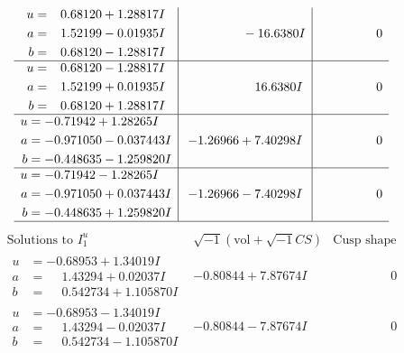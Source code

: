 \documentclass[1p]{elsarticle_modified}
\theoremstyle{definition}
\newcommand{\I}{\sqrt{-1}}
\begin{document}
$$\begin{array}{c|c|c}
\begin{aligned}
u &= \phantom{-}0.68120 + 1.28817 I \\
a &= \phantom{-}1.52199 - 0.01935 I \\
b &= \phantom{-}0.68120 - 1.28817 I\end{aligned}
 & \phantom{-0.000000 } -16.6380 I & \phantom{-0.000000 } 0 \\ \hline\begin{aligned}
u &= \phantom{-}0.68120 - 1.28817 I \\
a &= \phantom{-}1.52199 + 0.01935 I \\
b &= \phantom{-}0.68120 + 1.28817 I\end{aligned}
 & \phantom{-0.000000 -}16.6380 I & \phantom{-0.000000 } 0 \\ \hline\begin{aligned}
u &= -0.71942 + 1.28265 I \\
a &= -0.971050 - 0.037443 I \\
b &= -0.448635 - 1.259820 I\end{aligned}
 & -1.26966 + 7.40298 I & \phantom{-0.000000 } 0 \\ \hline\begin{aligned}
u &= -0.71942 - 1.28265 I \\
a &= -0.971050 + 0.037443 I \\
b &= -0.448635 + 1.259820 I\end{aligned}
 & -1.26966 - 7.40298 I & \phantom{-0.000000 } 0\\
 \hline 
 \end{array}$$\newpage$$\begin{array}{c|c|c}  
\text{Solutions to }I^u_{1}& \I (\text{vol} + \sqrt{-1}CS) & \text{Cusp shape}\\
 \hline 
\begin{aligned}
u &= -0.68953 + 1.34019 I \\
a &= \phantom{-}1.43294 + 0.02037 I \\
b &= \phantom{-}0.542734 + 1.105870 I\end{aligned}
 & -0.80844 + 7.87674 I & \phantom{-0.000000 } 0 \\ \hline\begin{aligned}
u &= -0.68953 - 1.34019 I \\
a &= \phantom{-}1.43294 - 0.02037 I \\
b &= \phantom{-}0.542734 - 1.105870 I\end{aligned}
 & -0.80844 - 7.87674 I & \phantom{-0.000000 } 0 \\ \hline\begin{aligned}

\end{aligned}
\end{array}$$
\end{document}
